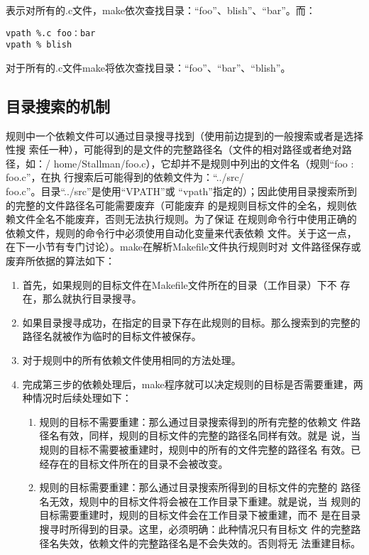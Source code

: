 表示对所有的.c文件，make依次查找目录：“foo”、blish”、“bar”。而：

\begin{Verbatim}[]
vpath %.c foo：bar
vpath % blish
\end{Verbatim}

对于所有的.c文件make将依次查找目录：“foo”、“bar”、“blish”。

\subsection{目录搜索的机制}
规则中一个依赖文件可以通过目录搜寻找到（使用前边提到的一般搜索或者是选择性搜
索任一种），可能得到的是文件的完整路径名（文件的相对路径或者绝对路径，如：/
home/Stallman/foo.c），它却并不是规则中列出的文件名（规则“foo : foo.c”，在执
行搜索后可能得到的依赖文件为：“../src/\\foo.c”。目录“../src”是使用“VPATH”或
“vpath”指定的）；因此使用目录搜索所到的完整的文件路径名可能需要废弃（可能废弃
的是规则目标文件的全名，规则依赖文件全名不能废弃，否则无法执行规则。为了保证
在规则命令行中使用正确的依赖文件，规则的命令行中必须使用自动化变量来代表依赖
文件。关于这一点，在下一小节有专门讨论）。make在解析Makefile文件执行规则时对
文件路径保存或废弃所依据的算法如下：

\begin{enumerate}
\itemsep=0pt \parskip=0pt
\item      首先，如果规则的目标文件在Makefile文件所在的目录（工作目录）下不
    存在，那么就执行目录搜寻。

\item  如果目录搜寻成功，在指定的目录下存在此规则的目标。那么搜索到的完整的
    路径名就被作为临时的目标文件被保存。

\item       对于规则中的所有依赖文件使用相同的方法处理。
\item 完成第三步的依赖处理后，make程序就可以决定规则的目标是否需要重建，两
    种情况时后续处理如下：
    \begin{enumerate}
      \item 规则的目标不需要重建：那么通过目录搜索得到的所有完整的依赖文
          件路径名有效，同样，规则的目标文件的完整的路径名同样有效。就是
          说，当规则的目标不需要被重建时，规则中的所有的文件完整的路径名
          有效。已经存在的目标文件所在的目录不会被改变。
      \item 规则的目标需要重建：那么通过目录搜索所得到的目标文件的完整的
          路径名无效，规则中的目标文件将会被在工作目录下重建。就是说，当
          规则的目标需要重建时，规则的目标文件会在工作目录下被重建，而不
          是在目录搜寻时所得到的目录。这里，必须明确：此种情况只有目标文
          件的完整路径名失效，依赖文件的完整路径名是不会失效的。否则将无
          法重建目标。
    \end{enumerate}
\end{enumerate}

